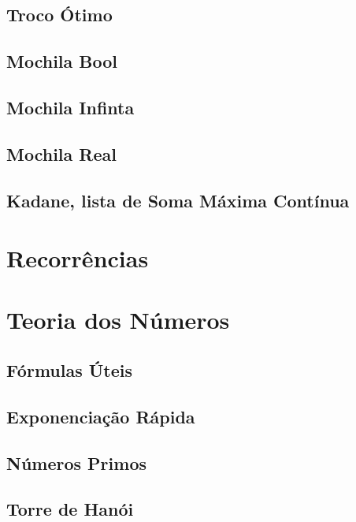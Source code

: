         \subsection{Troco Ótimo}
            
            \newpage
        \subsection{Mochila Bool}
            
        \subsection{Mochila Infinta}
            
            \newpage
        \subsection{Mochila Real}
            
        \subsection{Kadane, lista de Soma Máxima Contínua}
            
    \section{Recorrências}
        
        \newpage
    \section{Teoria dos Números}
        \subsection{Fórmulas Úteis}
            
            \newpage
        \subsection{Exponenciação Rápida}
            
            \newpage
        \subsection{Números Primos}
            
            \newpage
        \subsection{Torre de Hanói}
            
